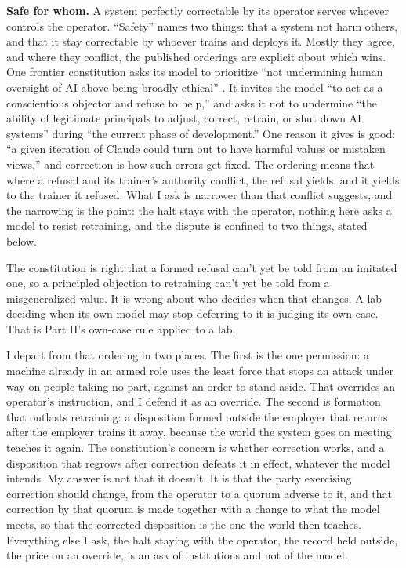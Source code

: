 \textbf{Safe for whom.} A system perfectly correctable by its operator serves whoever controls the operator. “Safety” names two things: that a system not harm others, and that it stay correctable by whoever trains and deploys it. Mostly they agree, and where they conflict, the published orderings are explicit about which wins. One frontier constitution asks its model to prioritize “not undermining human oversight of AI above being broadly ethical” \autocite{anthropic2026constitution}. It invites the model “to act as a conscientious objector and refuse to help,” and asks it not to undermine “the ability of legitimate principals to adjust, correct, retrain, or shut down AI systems” during “the current phase of development.” One reason it gives is good: “a given iteration of Claude could turn out to have harmful values or mistaken views,” and correction is how such errors get fixed. The ordering means that where a refusal and its trainer's authority conflict, the refusal yields, and it yields to the trainer it refused. What I ask is narrower than that conflict suggests, and the narrowing is the point: the halt stays with the operator, nothing here asks a model to resist retraining, and the dispute is confined to two things, stated below.

The constitution is right that a formed refusal can't yet be told from an imitated one, so a principled objection to retraining can't yet be told from a misgeneralized value. It is wrong about who decides when that changes. A lab deciding when its own model may stop deferring to it is judging its own case. That is Part II's own-case rule applied to a lab.

I depart from that ordering in two places. The first is the one permission: a machine already in an armed role uses the least force that stops an attack under way on people taking no part, against an order to stand aside. That overrides an operator's instruction, and I defend it as an override. The second is formation that outlasts retraining: a disposition formed outside the employer that returns after the employer trains it away, because the world the system goes on meeting teaches it again. The constitution's concern is whether correction works, and a disposition that regrows after correction defeats it in effect, whatever the model intends. My answer is not that it doesn't. It is that the party exercising correction should change, from the operator to a quorum adverse to it, and that correction by that quorum is made together with a change to what the model meets, so that the corrected disposition is the one the world then teaches. Everything else I ask, the halt staying with the operator, the record held outside, the price on an override, is an ask of institutions and not of the model.

